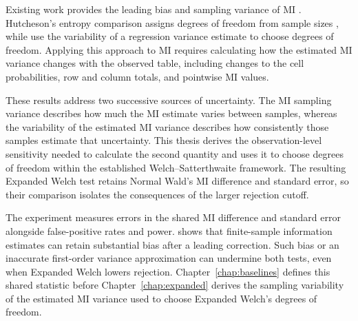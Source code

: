 Existing work provides the leading bias and sampling variance of MI
\citep{miller1955,moddemeijer1989,brillinger2004,paninski2003}.
Hutcheson's entropy comparison assigns degrees of freedom from sample sizes
\citep{hutcheson1970}, while \citet{panwall2002} use the variability of a
regression variance estimate to choose degrees of freedom. Applying this
approach to MI requires calculating how the estimated MI variance changes
with the observed table, including changes to the cell probabilities,
row and column totals, and pointwise MI values.

These results address two successive sources of uncertainty. The MI
sampling variance describes how much the MI estimate varies between
samples, whereas the variability of the estimated MI variance describes
how consistently those samples estimate that uncertainty. This thesis
derives the observation-level sensitivity needed to calculate the second
quantity and uses it to choose degrees of freedom within the established
Welch--Satterthwaite framework. The resulting Expanded Welch test retains
Normal Wald's MI difference and standard error, so their comparison
isolates the consequences of the larger rejection cutoff.

The experiment measures errors in the shared MI difference and standard
error alongside false-positive rates and power.
\citet{paninski2003} shows that finite-sample information estimates can
retain substantial bias after a leading correction. Such bias or an
inaccurate first-order variance approximation can undermine both tests,
even when Expanded Welch lowers rejection.
Chapter~\ref{chap:baselines} defines this shared statistic before
Chapter~\ref{chap:expanded} derives the sampling variability of the estimated
MI variance used to choose Expanded Welch's degrees of freedom.
